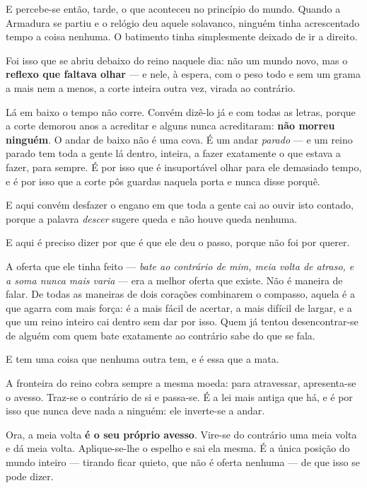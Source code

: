 \documentclass[livro.tex]{subfiles}
\begin{document}
\medskip

E percebe-se então, tarde, o que aconteceu no princípio do mundo. Quando a Armadura se
partiu e o relógio deu aquele solavanco, ninguém tinha acrescentado tempo a coisa
nenhuma. O batimento tinha simplesmente deixado de ir a direito.

\medskip

Foi isso que se abriu debaixo do reino naquele dia: não um mundo novo, mas o
\textbf{reflexo que faltava olhar} --- e nele, à espera, com o peso todo e sem um grama a
mais nem a menos, a corte inteira outra vez, virada ao contrário.

Lá em baixo o tempo não corre. Convém dizê-lo já e com todas as letras, porque a corte
demorou anos a acreditar e alguns nunca acreditaram: \textbf{não morreu ninguém}. O andar
de baixo não é uma cova. É um andar \emph{parado} --- e um reino parado tem toda a gente
lá dentro, inteira, a fazer exatamente o que estava a fazer, para sempre. É por isso que
é insuportável olhar para ele demasiado tempo, e é por isso que a corte pôs guardas
naquela porta e nunca disse porquê.

E aqui convém desfazer o engano em que toda a gente cai ao ouvir isto contado, porque a
palavra \emph{descer} sugere queda e não houve queda nenhuma.

E aqui é preciso dizer por que é que ele deu o passo, porque não foi por querer.

\medskip

A oferta que ele tinha feito --- \emph{bate ao contrário de mim, meia volta de atraso, e a
soma nunca mais varia} --- era a melhor oferta que existe. Não é maneira de falar. De todas
as maneiras de dois corações combinarem o compasso, aquela é a que agarra com mais força:
é a mais fácil de acertar, a mais difícil de largar, e a que um reino inteiro cai dentro
sem dar por isso. Quem já tentou desencontrar-se de alguém com quem bate exatamente ao
contrário sabe do que se fala.

E tem uma coisa que nenhuma outra tem, e é essa que a mata.

\medskip

A fronteira do reino cobra sempre a mesma moeda: para atravessar, apresenta-se o avesso.
Traz-se o contrário de si e passa-se. É a lei mais antiga que há, e é por isso que \Joa
nunca deve nada a ninguém: ele inverte-se a andar.

Ora, a meia volta \textbf{é o seu próprio avesso}. Vire-se do contrário uma meia volta e
dá meia volta. Aplique-se-lhe o espelho e sai ela mesma. É a única posição do mundo inteiro
--- tirando ficar quieto, que não é oferta nenhuma --- de que isso se pode dizer.
\end{document}
